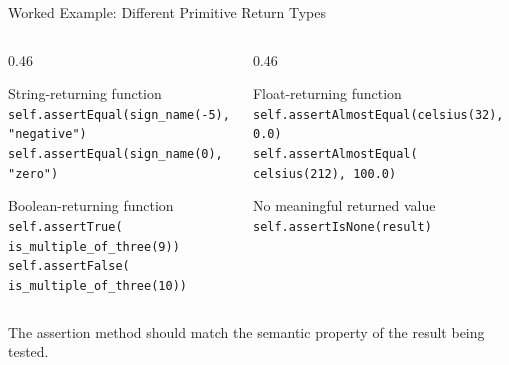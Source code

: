 \documentclass[aspectratio=169,10pt]{beamer}
\begin{document}
\begin{frame}[shrink=2]{Worked Example: Different Primitive Return Types}
  \begin{columns}[T,onlytextwidth]
    \begin{column}{0.46\textwidth}
      \begin{block}{String-returning function}
        \texttt{self.assertEqual(sign\_name(-5),}\\
        \hspace*{0.18in}\texttt{"negative")}\\
        \texttt{self.assertEqual(sign\_name(0), "zero")}
      \end{block}

      \begin{block}{Boolean-returning function}
        \texttt{self.assertTrue(}\\
        \hspace*{0.18in}\texttt{is\_multiple\_of\_three(9))}\\
        \texttt{self.assertFalse(}\\
        \hspace*{0.18in}\texttt{is\_multiple\_of\_three(10))}
      \end{block}
    \end{column}

    \begin{column}{0.46\textwidth}
      \begin{block}{Float-returning function}
        \texttt{self.assertAlmostEqual(celsius(32), 0.0)}\\
        \texttt{self.assertAlmostEqual(}\\
        \hspace*{0.18in}\texttt{celsius(212), 100.0)}
      \end{block}

      \begin{block}{No meaningful returned value}
        \texttt{self.assertIsNone(result)}
      \end{block}
    \end{column}
  \end{columns}

  \begin{keyidea}
    The assertion method should match the semantic property of the result being tested.
  \end{keyidea}
\end{frame}
\end{document}
